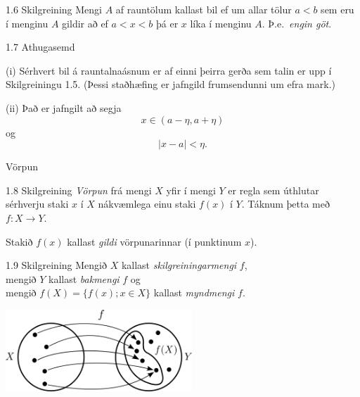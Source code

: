 \documentclass[icelandic,a4paper,12pt]{article}
\begin{document}
\begin{frame}
\begin{block}{1.6 Skilgreining} Mengi $A$ af rauntölum kallast bil ef um
allar tölur $a<b$ sem eru í menginu $A$ gildir að ef $a<x<b$ þá er $x$
líka í menginu $A$. \pause Þ.e.~\emph{engin göt}.
\end{block}

\pause

\begin{block}{1.7 Athugasemd}  

(i) Sérhvert bil á rauntalnaásnum er af
einni þeirra gerða sem talin er upp í Skilgreiningu 1.5.   (Þessi
staðhæfing er jafngild frumsendunni um efra mark.)

\pause

(ii) Það er jafngilt að segja 
$$x \in (a-\eta,a+\eta)$$ 
og 
$$|x-a| < \eta.$$
\end{block}
\end{frame}

\begin{frame}{Vörpun}
\begin{block}{1.8 Skilgreining}
\emph{Vörpun} frá mengi $X$ yfir í mengi $Y$ er regla sem úthlutar sérhverju
staki $x$ í $X$ nákvæmlega einu staki $f(x)$ í $Y$. Táknum þetta með
$f:X \to Y$. 

Stakið $f(x)$ kallast \emph{gildi} vörpunarinnar (í punktinum $x$).
\end{block}

\pause

\begin{block}
{1.9 Skilgreining}
Mengið $X$ kallast \emph{skilgreiningarmengi} $f$,\\ 
mengið $Y$ kallast \emph{bakmengi} $f$ og\\
mengið $f(X) = \{ f(x); x \in X \}$ kallast \emph{myndmengi} $f$.
\end{block}

\begin{center}
 \includegraphics[width=7cm,keepaspectratio=true]{./myndir/kafli01/02_Mynd_vorpunar.png}
\end{center}
\end{frame}
\end{document}
